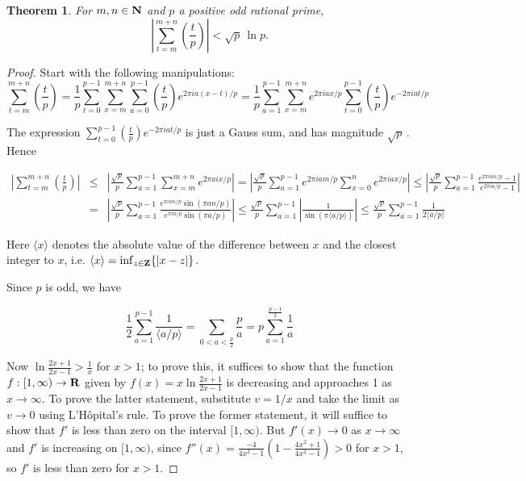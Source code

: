 \documentclass[12pt]{article}
\newtheorem{theorem}{Theorem}
\theoremstyle{definition}
\begin{document}
\begin{theorem}
For $m,n \in {\bf N}$ and $p$ a positive odd rational
prime,
$$\left|\sum_{t=m}^{m+n} \left(\frac{t}{p}\right)\right| < \sqrt{p} \,
\ln p.$$
\end{theorem}

\begin{proof}
Start with the following manipulations:
$$
\sum_{t=m}^{m+n} \left(\frac{t}{p}\right) = \frac{1}{p}
\sum_{t=0}^{p-1} \sum_{x=m}^{m+n} \sum_{a=0}^{p-1}
\left(\frac{t}{p} \right) e^{2 \pi i a (x-t)/p} = \frac{1}{p}
\sum_{a=1}^{p-1} \sum_{x=m}^{m+n} e^{2 \pi i a x/p}
\sum_{t=0}^{p-1} \left(\frac{t}{p} \right) e^{-2 \pi i a t/p}
$$

The expression \begin{math}\sum_{t=0}^{p-1} (\frac{t}{p}) e^{-2 \pi i
a t/p}\end{math} is just a Gauss sum, and has magnitude 
\begin{math}\sqrt{p} \,\end{math}. Hence

\begin{eqnarray*}
\left|\sum_{t=m}^{m+n} \left(\frac{t}{p}\right)\right| & \leq &
\left|\frac{\sqrt{p}}{p} \sum_{a=1}^{p-1}
\sum_{x=m}^{m+n} e^{2 \pi a i x/p}\right|
= \left|\frac{\sqrt{p}}{p} \sum_{a=1}^{p-1} e^{2 \pi i a m/p}
\sum_{x=0}^{n} e^{2 \pi i a x/p}\right| \leq
\left|\frac{\sqrt{p}}{p} \sum_{a=1}^{p-1} 
\frac{e^{2 \pi i a n/p}-1}{e^{2 \pi ia/p}-1}\right|
\\
& = & \left|\frac{\sqrt{p}}{p} \sum_{a=1}^{p-1}
\frac{e^{\pi ian/p} \sin(\pi a n/p)}{e^{\pi ia/p} \sin(\pi a/p)}\right|
\leq \frac{\sqrt{p}}{p} \sum_{a=1}^{p-1} \left|\frac{1}{\sin(\pi
\langle a/p \rangle)}\right|
\leq \frac{\sqrt{p}}{p} \sum_{a=1}^{p-1} \frac{1}{2 \langle a/p \rangle}
\end{eqnarray*}

Here $\langle x \rangle$ denotes the absolute value of the difference
between $x$ and the closest integer to $x$, i.e. $\langle x \rangle = 
\inf_{z \in {\bf Z}} \{|x-z|\}$.

Since $p$ is odd, we have

$$
\frac{1}{2} \sum_{a=1}^{p-1} \frac{1}{\langle a/p \rangle} = 
\sum_{0<a<\frac{p}{2}} \frac{p}{a} = 
p \sum_{a=1}^{\frac{p-1}{2}} \frac{1}{a}
$$

Now $\ln \frac{2x+1}{2x-1} > \frac{1}{x}$ for $x>1$; to prove this, it
suffices to show that the function $f:[1,\infty)\rightarrow{\bf R}$
given by $f(x)=x \ln \frac{2x+1}{2x-1}$
is decreasing and approaches 1 as $x\rightarrow \infty$. To prove the
latter statement, substitute $v=1/x$ and take the limit as $v
\rightarrow 0$ using L'H\^opital's rule. To prove the former statement,
it will suffice to show that $f'$ is less than zero on the interval
$[1,\infty)$. But $f'(x)\rightarrow 0$ as $x \rightarrow \infty$ and
$f'$ is increasing on $[1,\infty)$, since $f''(x) = 
\frac{-4}{4 x^2-1} (1-\frac{4x^2+1}{4x^2-1}) > 0$ for $x>1$, so $f'$
is less than zero for $x>1$.


\end{proof}
\end{document}
